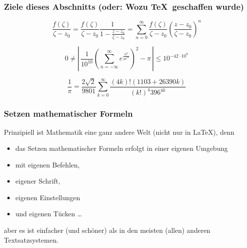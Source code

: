 
\subtitle{Setzen Mathematischer Formeln}
\date{2017-05-02}



\begin{frame}
  \frametitle{Ziele dieses Abschnitts (oder: Wozu \TeX\ geschaffen wurde)}

  \onslide<+->

  \begin{equation*}
    \frac{f\left(\zeta\right)}{\zeta-z_0} = \frac{f\left(\zeta\right)}
    {\zeta-z_0}\frac{1}{
      1-\frac{z-z_0}{\zeta-z_0}} = \sum_{n=0}^{\infty}\frac{f\left(\zeta\right)}
    {\zeta-z_0}
    \left(\frac{z-z_0}{\zeta-z_0}\right)^n
  \end{equation*}

  \medskip

  \begin{equation*}
    0 \neq \left|\, \frac{1}{10^{10}} \left( \sum_{n = -\infty}^{\infty}
        e^{\frac{n^2}{10^{10}}} \right)^2 - \pi \,\right|
    \le 10^{-42 \cdot 10^9}
  \end{equation*}

  \medskip

  \begin{equation*}
    \frac{1}{\pi} = \frac{2\sqrt{2}}{9801} \sum^\infty_{k=0} \frac{(4k)!(1103+26390k)}{(k!)^4 396^{4k}}
  \end{equation*}

\end{frame}

\begin{frame}
  \frametitle{Setzen mathematischer Formeln}

  \onslide<+->

  Prinzipiell ist Mathematik eine ganz andere Welt (nicht nur in \LaTeX), denn
  \begin{itemize}
  \item<+-> das Setzen mathematischer Formeln erfolgt in einer eigenen Umgebung
  \item<+-> mit eigenen Befehlen,
  \item<+-> eigener Schrift,
  \item<+-> eigenen Einstellungen
  \item<+-> und eigenen Tücken \dots
  \end{itemize}

  \onslide<+->

  aber es ist einfacher (und schöner) als in den meisten (allen) anderen Textsatzsystemen.
\end{frame}

